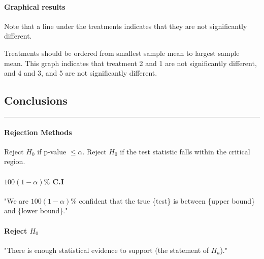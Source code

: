 \documentclass[10pt]{article}
\begin{document}
\paragraph{Graphical results} Note that a line under the treatments indicates that they are not significantly different. \\
\begin{multicols}{2}


  
  \noindent Treatments should be ordered from smallest sample mean to largest sample mean. This graph indicates that treatment 2 and 1 are not significantly different, and 4 and 3, and 5 are not significantly different.
\end{multicols}

\subsection*{Conclusions}
\hrule width 5cm
\vspace{6pt}
\paragraph{Rejection Methods} Reject $H_0$ if p-value $\leq \alpha$. Reject $H_0$ if the test statistic falls within the critical region.
\paragraph{$100(1-\alpha)\%$ C.I} "We are $100(1-\alpha)\%$ confident that the true \{test\} is between \{upper bound\} and \{lower bound\}."
\paragraph{Reject $H_0$} "There is enough statistical evidence to support (the statement of $H_a$)."
\end{document}
